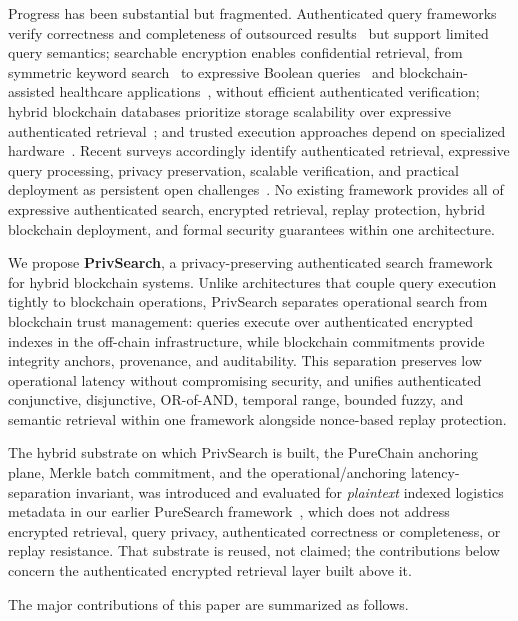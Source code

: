 \documentclass[journal]{IEEEtran}
\theoremstyle{tight}
\theoremstyle{remark}
\theoremstyle{plain}
\begin{document}
Progress has been substantial but fragmented. Authenticated query frameworks verify correctness and completeness of outsourced results~\cite{Yang,Xu,Yin,Wu} but support limited query semantics; searchable encryption enables confidential retrieval, from symmetric keyword search~\cite{Curtmola2006} to expressive Boolean queries~\cite{Cash2013} and blockchain-assisted healthcare applications~\cite{LeeJoonYoung,Zhang,Yao,Lu}, without efficient authenticated verification; hybrid blockchain databases prioritize storage scalability over expressive authenticated retrieval~\cite{Li,Zhou}; and trusted execution approaches depend on specialized hardware~\cite{WuHaotian}. Recent surveys accordingly identify authenticated retrieval, expressive query processing, privacy preservation, scalable verification, and practical deployment as persistent open challenges~\cite{Asiamah}. No existing framework provides all of expressive authenticated search, encrypted retrieval, replay protection, hybrid blockchain deployment, and formal security guarantees within one architecture.
 
 
We propose \textbf{PrivSearch}, a privacy-preserving authenticated search framework for hybrid blockchain systems. Unlike architectures that couple query execution tightly to blockchain operations, PrivSearch separates operational search from blockchain trust management: queries execute over authenticated encrypted indexes in the off-chain infrastructure, while blockchain commitments provide integrity anchors, provenance, and auditability. This separation preserves low operational latency without compromising security, and unifies authenticated conjunctive, disjunctive, OR-of-AND, temporal range, bounded fuzzy, and semantic retrieval within one framework alongside nonce-based replay protection.

The hybrid substrate on which PrivSearch is built, the PureChain anchoring plane, Merkle batch commitment, and the operational/anchoring latency-separation invariant, was introduced and evaluated for \emph{plaintext} indexed logistics metadata in our earlier PureSearch framework~\cite{Nnadiekwe2026PureSearchHCC}, which does not address encrypted retrieval, query privacy, authenticated correctness or completeness, or replay resistance. That substrate is reused, not claimed; the contributions below concern the authenticated encrypted retrieval layer built above it.
 
The major contributions of this paper are summarized as follows.
 
\end{document}
